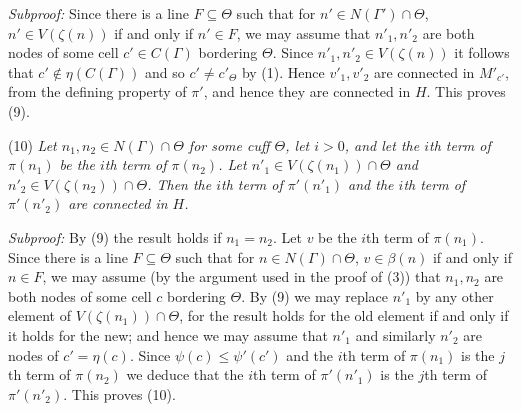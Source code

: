 \textit{Subproof:} Since there is a line $F \subseteq \Theta$ such that for $n' \in N(\Gamma') \cap \Theta$, $n' \in V(\zeta(n))$ if and only if $n' \in F$, we may assume that $n'_1, n'_2$ are both nodes of some cell $c' \in C(\Gamma)$ bordering $\Theta$. Since $n'_1, n'_2 \in V(\zeta(n))$ it follows that $c' \notin \eta(C(\Gamma))$ and so $c' \ne c'_\Theta$ by (1). Hence $v'_1, v'_2$ are connected in $M'_{c'}$, from the defining property of $\pi'$, and hence they are connected in $H$. This proves (9).

\hspace*{12pt}(10) \textit{Let $n_1, n_2 \in N(\Gamma) \cap \Theta$ for some cuff $\Theta$, let $i > 0$, and let the $i$th term of $\pi(n_1)$ be the $i$th term of $\pi(n_2)$. Let $n'_1 \in V(\zeta(n_1)) \cap \Theta$ and $n'_2 \in V(\zeta(n_2)) \cap \Theta$. Then the $i$th term of $\pi'(n'_1)$ and the $i$th term of $\pi'(n'_2)$ are connected in $H$.}

\textit{Subproof:} By (9) the result holds if $n_1 = n_2$. Let $v$ be the $i$th term of $\pi(n_1)$. Since there is a line $F \subseteq \Theta$ such that for $n \in N(\Gamma) \cap \Theta$, $v \in \beta(n)$ if and only if $n \in F$, we may assume (by the argument used in the proof of (3)) that $n_1, n_2$ are both nodes of some cell $c$ bordering $\Theta$. By (9) we may replace $n'_1$ by any other element of $V(\zeta(n_1)) \cap \Theta$, for the result holds for the old element if and only if it holds for the new; and hence we may assume that $n'_1$ and similarly $n'_2$ are nodes of $c' = \eta(c)$. Since $\psi(c) \le \psi'(c')$ and the $i$th term of $\pi(n_1)$ is the $j$th term of $\pi(n_2)$ we deduce that the $i$th term of $\pi'(n'_1)$ is the $j$th term of $\pi'(n'_2)$. This proves (10).
